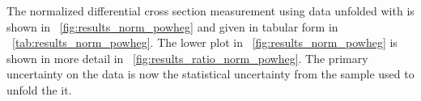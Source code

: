 


The normalized differential cross section measurement using data unfolded with
\POWHEG is shown in \FIG~\ref{fig:results_norm_powheg} and given in tabular
form in \TAB~\ref{tab:results_norm_powheg}. The lower plot in
\FIG~\ref{fig:results_norm_powheg} is shown in more detail in
\FIG~\ref{fig:results_ratio_norm_powheg}. The primary uncertainty on the data
is now the statistical uncertainty from the \POWHEG sample used to unfold the
it.



